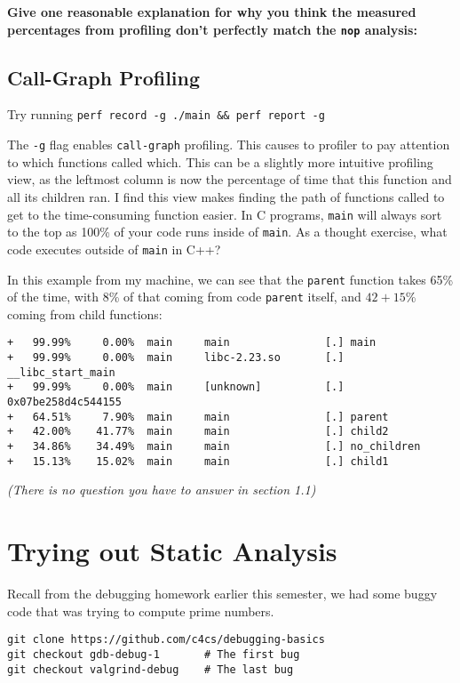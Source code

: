\documentclass{article}
\begin{document}
\textbf{Give one reasonable explanation for why you think the measured
  percentages from profiling don't perfectly match the \texttt{nop} analysis:}
\vfill


\subsection{Call-Graph Profiling}
Try running \texttt{perf record -g ./main \&\& perf report -g}

The \texttt{-g} flag enables \texttt{call-graph} profiling. This causes to
profiler to pay attention to which functions called which. This can be a
slightly more intuitive profiling view, as the leftmost column is now the
percentage of time that this function and all its children ran. I find this
view makes finding the path of functions called to get to the time-consuming
function easier. In C programs, \texttt{main} will always sort to the top as
100\% of your code runs inside of \texttt{main}. As a thought exercise, what
code executes outside of \texttt{main} in C++?

In this example from my machine, we can see that the \texttt{parent} function
takes 65\% of the time, with 8\% of that coming from code \texttt{parent}
itself, and $42+15$\% coming from child functions:

{\footnotesize
\begin{verbatim}
+   99.99%     0.00%  main     main               [.] main
+   99.99%     0.00%  main     libc-2.23.so       [.] __libc_start_main
+   99.99%     0.00%  main     [unknown]          [.] 0x07be258d4c544155
+   64.51%     7.90%  main     main               [.] parent
+   42.00%    41.77%  main     main               [.] child2
+   34.86%    34.49%  main     main               [.] no_children
+   15.13%    15.02%  main     main               [.] child1
\end{verbatim}
}

\emph{\small
(There is no question you have to answer in section 1.1)
}

\newpage
\section{Trying out Static Analysis}

Recall from the debugging homework earlier this semester, we had some buggy
code that was trying to compute prime numbers.

\begin{verbatim}
git clone https://github.com/c4cs/debugging-basics
git checkout gdb-debug-1       # The first bug
git checkout valgrind-debug    # The last bug
\end{verbatim}
\end{document}
